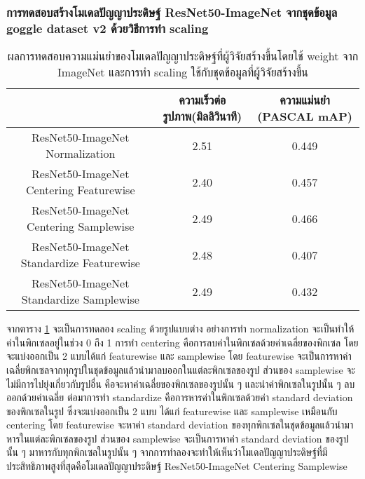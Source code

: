 \subsubsection{การทดสอบสร้างโมเดลปัญญาประดิษฐ์ ResNet50-ImageNet จากชุดข้อมูล goggle dataset v2 ด้วยวิธีการทำ scaling}
\begin{table}[!ht]
	\centering
	\begin{tabular}{|c|c|c|}
			\hline
			{}&{ความเร็วต่อรูปภาพ(มิลลิวินาที)}&{ความแม่นยำ (PASCAL mAP)}			\\
			\hline
			ResNet50-ImageNet	 Normalization				& 2.51			& 0.449				\\
			ResNet50-ImageNet	 Centering Featurewise		& 2.40			& 0.457				\\
			ResNet50-ImageNet	 Centering Samplewise		& 2.49			& 0.466				\\
			ResNet50-ImageNet	 Standardize Featurewise		& 2.48			& 0.407				\\
			ResNet50-ImageNet	 Standardize Samplewise		& 2.49			& 0.432				\\
			\hline
	\end{tabular}
\caption{ผลการทดสอบความแม่นยำของโมเดลปัญญาประดิษฐ์ที่ผู้วิจัยสร้างขึ้นโดยใช้ weight จาก ImageNet และการทำ scaling ใช้กับชุดข้อมูลที่ผู้วิจัยสร้างขึ้น}
\label{tab: Test PASCAL mAP of dataset created by the researcher with pretrain weight imagenet and scaling}
\end{table}

จากตาราง \ref{tab: Test PASCAL mAP of dataset created by the researcher with pretrain weight imagenet and scaling} จะเป็นการทดลอง scaling ด้วยรูปแบบต่าง อย่างการทำ normalization จะเป็นทำให้ค่าในพิกเซลอยู่ในช่วง 0 ถึง 1 การทำ centering คือการลบค่าในพิกเซลด้วยค่าเฉลี่ยของพิกเซล โดยจะแบ่งออกเป็น 2 แบบได้แก่ featurewise และ samplewise โดย featurewise จะเป็นการหาค่าเฉลี่ยพิกเซลจากทุกรูปในชุดข้อมูลแล้วนำมาลบออกในแต่ละพิกเซลของรูป ส่วนของ samplewise จะไม่มีการไปยุ่งเกี่ยวกับรูปอื่น คือจะหาค่าเฉลี่ยของพิกเซลของรูปนั้น ๆ และนำค่าพิกเซลในรูปนั้น ๆ ลบออกด้วยค่าเฉลี่ย ต่อมาการทำ standardize คือการหารค่าในพิกเซลด้วยค่า standard deviation ของพิกเซลในรูป ซึ่งจะแบ่งออกเป็น 2 แบบ ได้แก่ featurewise และ samplewise เหมือนกับ centering โดย featurewise จะหาค่า standard deviation ของทุกพิกเซลในชุดข้อมูลแล้วนำมาหารในแต่ละพิกเซลของรูป ส่วนของ samplewise จะเป็นการหาค่า standard deviation ของรูปนั้น ๆ มาหารกับทุกพิกเซลในรูปนั้น ๆ จากการทำลองจะทำให้เห็นว่าโมเดลปัญญาประดิษฐ์ที่มีประสิทธิภาพสูงที่สุดคือโมเดลปัญญาประดิษฐ์ ResNet50-ImageNet	 Centering Samplewise
\clearpage
